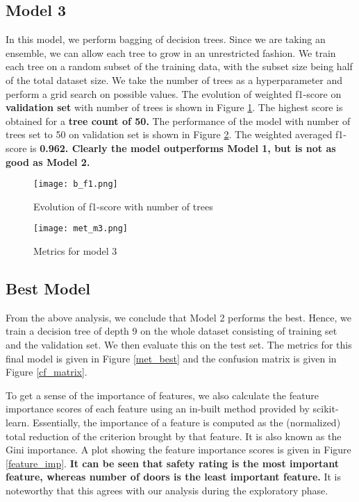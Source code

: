 \documentclass[conference]{IEEEtran}
\begin{document}
\subsection{Model 3}

In this model, we perform bagging of decision trees. Since we are taking an ensemble, we can allow each tree to grow in an unrestricted fashion. We train each tree on a random subset of the training data, with the subset size being half of the total dataset size. We take the number of trees as a hyperparameter and perform a grid search on possible values. The evolution of weighted f1-score on \textbf{validation set} with number of trees is shown in Figure \ref{B_f1}. The highest score is obtained for a \textbf{tree count of 50.} The performance of the model with number of trees set to 50 on validation set is shown in Figure \ref{met_m3}. The weighted averaged f1-score is \textbf{0.962. Clearly the model outperforms Model 1, but is not as good as Model 2.}

\begin{figure}[tbh]
\centering
\texttt{[image: b\_f1.png]}
\caption{Evolution of f1-score with number of trees}
\label{B_f1}
\end{figure}

\begin{figure}[tbh]
\centering
\texttt{[image: met\_m3.png]}
\caption{Metrics for model 3 }
\label{met_m3}
\end{figure}

\subsection{Best Model}

From the above analysis, we conclude that Model 2 performs the best. Hence, we train a decision tree of depth 9 on the whole dataset consisting of training set and the validation set. We then evaluate this on the test set. The metrics for this final model is given in Figure \ref{met_best} and the confusion matrix is given in Figure \ref{cf_matrix}. 

To get a sense of the importance of features, we also calculate the feature importance scores of each feature using an in-built method provided by scikit-learn. Essentially, the importance of a feature is computed as the (normalized) total reduction of the criterion brought by that feature. It is also known as the Gini importance. A plot showing the feature importance scores is given in Figure \ref{feature_imp}. \textbf{It can be seen that safety rating is the most important feature, whereas number of doors is the least important feature.} It is noteworthy that this agrees with our analysis during the exploratory phase.
\end{document}
